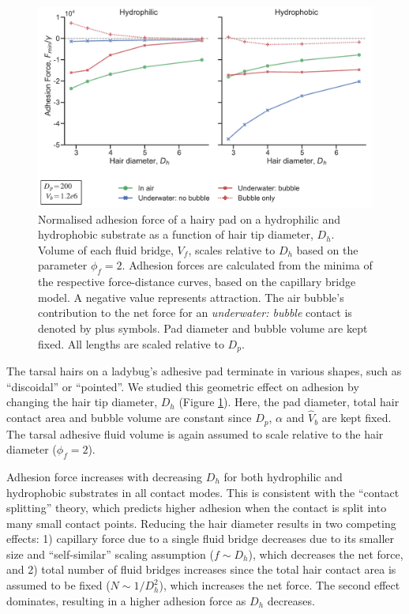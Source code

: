 \documentclass[vruler,JEB]{COB}%
\begin{document}
\begin{figure}
\centering
\includegraphics[width=6in]{Figure6-Model_effect_of_hair_size}
\caption{\label{fig:Effect-of-hair}Normalised adhesion force of a hairy pad on a hydrophilic and hydrophobic substrate as a function of
hair tip diameter, $D_{h}$. Volume of each fluid bridge, $V_{f}$, scales
relative to $D_{h}$ based on the parameter $\phi_{f}=2$. Adhesion
forces are calculated from the minima of the respective force-distance
curves, based on the capillary bridge model. A negative value represents
attraction. The air bubble's contribution to the net force for an \emph{underwater:
bubble} contact is denoted by plus symbols. Pad diameter and bubble
volume are kept fixed. All lengths are scaled relative to $D_{p}$.}
\end{figure}
The tarsal hairs on a ladybug's adhesive pad terminate in various shapes, such as ``discoidal''
or ``pointed''. We studied this geometric effect on adhesion by
changing the hair tip diameter, $D_{h}$ (Figure \ref{fig:Effect-of-hair}).
Here, the pad diameter, total hair contact area and bubble volume
are constant since $D_{p}$, $\alpha$ and $\hat{V}_{b}$ are kept
fixed. The tarsal adhesive fluid volume is again assumed to scale relative
to the hair diameter ($\phi_{f}=2$).

Adhesion force increases with decreasing $D_{h}$ for both hydrophilic
and hydrophobic substrates in all contact modes. This is consistent
with the ``contact splitting'' theory, which predicts higher adhesion
when the contact is split into many small contact points\citep{RN24}.
Reducing the hair diameter results in two competing effects: 1) capillary
force due to a single fluid bridge decreases due to its smaller size
and ``self-similar'' scaling assumption ($f\sim D_{h}$), which
decreases the net force, and 2) total number of fluid bridges increases
since the total hair contact area is assumed to be fixed ($N\sim1/D_{h}^{2}$),
which increases the net force. The second effect dominates, resulting
in a higher adhesion force as $D_{h}$ decreases. 
\end{document}
